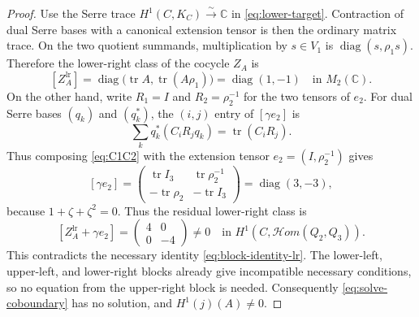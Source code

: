 \documentclass[10pt,a4paper]{amsart}
\newcommand{\CC}{\mathbb C}
\newcommand{\cHom}{\mathcal{H}om}
\newcommand{\tr}{\operatorname{tr}}
\begin{document}
\begin{proof}
Use the Serre trace $H^1(C,K_C)\xrightarrow{\sim}\CC$ in
\eqref{eq:lower-target}.  Contraction of dual Serre bases with a canonical
extension tensor is then the ordinary matrix trace.  On the two
quotient summands, multiplication by $s\in V_1$ is
$\operatorname{diag}(s,\rho_1s)$.  Therefore the lower-right class of the
cocycle $Z_A$ is
\begin{equation}\label{eq:ZA-lr}
 [Z_A^{\mathrm{lr}}]
 =\operatorname{diag}\bigl(\tr A,\tr(A\rho_1)\bigr)
 =\operatorname{diag}(1,-1)
 \quad\text{in }M_2(\CC).
\end{equation}
On the other hand, write $R_1=I$ and $R_2=\rho_2^{-1}$ for the
two tensors of $e_2$.  For dual Serre bases $(q_k)$ and $(q_k^*)$, the
$(i,j)$ entry of $[\gamma e_2]$ is
$$
 \sum_k q_k^*(C_iR_jq_k)=\tr(C_iR_j).
$$
Thus composing \eqref{eq:C1C2} with the extension tensor
$e_2=(I,\rho_2^{-1})$ gives
\begin{equation}\label{eq:gamma-e2}
 [\gamma e_2]=
 \begin{pmatrix}
  \tr I_3&\tr\rho_2^{-1}\\
  -\tr\rho_2&-\tr I_3
 \end{pmatrix}
 =\operatorname{diag}(3,-3),
\end{equation}
because $1+\zeta+\zeta^2=0$.  Thus the residual lower-right class is
\begin{equation}\label{eq:final-matrix}
 [Z_A^{\mathrm{lr}}+\gamma e_2]
 =\begin{pmatrix}4&0\\0&-4\end{pmatrix}\neq0
 \quad\text{in }H^1\!\left(C,\cHom(Q_2,Q_3)\right).
\end{equation}
This contradicts the necessary identity
\eqref{eq:block-identity-lr}.  The lower-left, upper-left, and lower-right
blocks already give incompatible necessary conditions, so no equation
from the upper-right block is needed.  Consequently
\eqref{eq:solve-coboundary} has no solution, and
$H^1(j)(A)\neq0$.
\end{proof}
\end{document}
